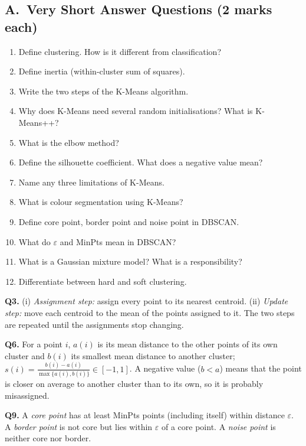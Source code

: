 \subsection*{A.\ Very Short Answer Questions (2 marks each)}
\begin{enumerate}
  \item Define clustering. How is it different from classification? 
  \item Define inertia (within-cluster sum of squares). 
  \item Write the two steps of the K-Means algorithm. 
  \item Why does K-Means need several random initialisations? What is K-Means++? 
  \item What is the elbow method? 
  \item Define the silhouette coefficient. What does a negative value mean? 
  \item Name any three limitations of K-Means. 
  \item What is colour segmentation using K-Means? 
  \item Define core point, border point and noise point in DBSCAN. 
  \item What do $\varepsilon$ and MinPts mean in DBSCAN? 
  \item What is a Gaussian mixture model? What is a responsibility? 
  \item Differentiate between hard and soft clustering. 
\end{enumerate}

\begin{modelans}[: Q3, Q6 and Q9]
\textbf{Q3.} (i) \emph{Assignment step:} assign every point to its nearest centroid. (ii) \emph{Update step:} move each centroid to the mean of the points assigned to it. The two steps are repeated until the assignments stop changing.\par
\textbf{Q6.} For a point $i$, $a(i)$ is its mean distance to the other points of its own cluster and $b(i)$ its smallest mean distance to another cluster; $s(i)=\frac{b(i)-a(i)}{\max\{a(i),b(i)\}}\in[-1,1]$. A negative value ($b<a$) means that the point is closer on average to another cluster than to its own, so it is probably misassigned.\par
\textbf{Q9.} A \emph{core point} has at least MinPts points (including itself) within distance $\varepsilon$. A \emph{border point} is not core but lies within $\varepsilon$ of a core point. A \emph{noise point} is neither core nor border.
\end{modelans}

